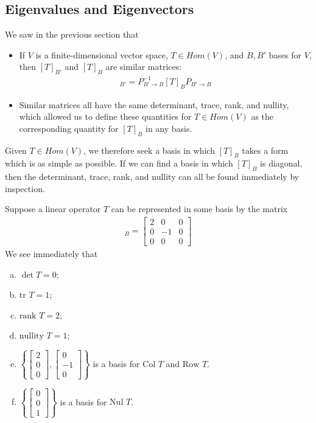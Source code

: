 \documentclass[12pt,letterpaper,reqno]{article}
\numberwithin{equation}{section}
\newcommand{\nullity}{\text{nullity }}
\begin{document}
\subsection{Eigenvalues and Eigenvectors}
We saw in the previous section that 
\begin{itemize}
	\item If $V$ is a finite-dimensional vector space, $T \in Hom(V)$, and $B,B'$ bases for $V$, then $[T]_{B'}$ and $[T]_B$ are similar matrices:
\begin{align*}
	[T]_{B'}=P_{B' \to B}^{-1}[T]_BP_{B' \to B}
\end{align*}
\item Similar matrices all have the same determinant, trace, rank, and nullity, which allowed us to define these quantities for $T \in Hom(V)$ as the corresponding quantity for $[T]_B$ in any basis.
\end{itemize}
Given $T \in Hom(V)$, we therefore seek a basis in which $[T]_B$ takes a form which is as simple as possible. 
If we can find a basis in which $[T]_B$ is diagonal, then the determinant, trace, rank, and nullity can all be found immediately by inspection.
\begin{example}
Suppose a linear operator $T$ can be represented in some basis by the matrix
\begin{align*}
	[T]_B=\begin{bmatrix}
		2 & 0 & 0 \\
		0 & -1 & 0 \\
		0 & 0 & 0
	\end{bmatrix}
\end{align*}
We see immediately that
\begin{enumerate}[(a)]
	\item $\det T=0$;
	\item $\text{tr } T=1$;
	\item $\text{rank } T=2$;
	\item $\nullity T=1$;
	\item $\left\{\begin{bmatrix}
		2 \\ 0 \\ 0
	\end{bmatrix}, \begin{bmatrix}
		0 \\ -1 \\ 0
	\end{bmatrix}\right\}$ is a basis for $\text{Col }T$ and $\text{Row }T$.
	\item $\left\{\begin{bmatrix}
		0 \\ 0 \\ 1
	\end{bmatrix}\right\}$ is a basis for $\text{Nul }T$.
\end{enumerate}
\end{example}
\end{document}
